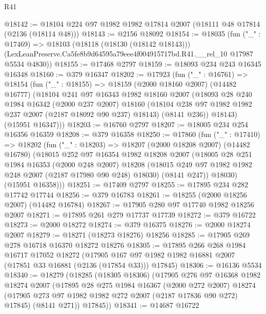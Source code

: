 \begin{lexlean}{R41}
\begin{coremodule}
@18142 := @18104 @224 @97 @1982 @1982 @17814 @2007 (@18111 @48 @17814 (@2136 (@18114 @48)))
@18143 := @2156 @18092
@18154 := @18035
    (fun ("_" : @17469) =>
    @18103
      (@18118 (@18130 (@18142 @18143)))
      (LexLeanPreserve.Ca5fe8b9d64595a79eee4f004915717bd.R41.__rel_10 @17987 @5534 @4830))
@18155 := @17468 @2797
@18159 := @18093 @234 @243 @16345 @16348
@18160 := @379 @16347
@18202 := @17923
    (fun ("_" : @16761) =>
    @18154
      (fun ("_" : @18155) =>
      @18159
        (@2000 @18160 @2007)
        (@14482 @16777)
        (@18104
          @241
          @97
          @16343
          @1982
          @18160
          @2007
          (@18093
            @28
            @240
            @1984
            @16342
            (@2000 @237 @2007)
            @18160
            (@18104 @238 @97 @1982 @1982 @237 @2007 (@2187 @18092 @90 @237) @18143)
            (@8141 @236))
          @18143)
        (@15951 @16347)))
@18203 := @16760 @2797
@18207 := @18005 @234 @254 @16356 @16359
@18208 := @379 @16358
@18250 := @17860
    (fun ("_" : @17410) =>
    @18202
      (fun ("_" : @18203) =>
      @18207
        (@2000 @18208 @2007)
        (@14482 @16780)
        (@18015
          @252
          @97
          @16354
          @1982
          @18208
          @2007
          (@18005
            @28
            @251
            @1984
            @16353
            (@2000 @248 @2007)
            @18208
            (@18015 @249 @97 @1982 @1982 @248 @2007 (@2187 @17980 @90 @248) @18030)
            (@8141 @247))
          @18030)
        (@15951 @16358)))
@18251 := @17409 @2797
@18255 := @17895 @234 @282 @17742 @17744
@18256 := @379 @16783
@18261 := @18255 (@2000 @18256 @2007) (@14482 @16784)
@18267 := @17905 @280 @97 @17740 @1982 @18256 @2007
@18271 := @17895 @261 @279 @17737 @17739
@18272 := @379 @16722
@18273 := @2000 @18272
@18274 := @379 @16375
@18276 := @2000 @18274 @2007
@18279 := @18271 (@18273 @18276) @18256
@18285 := @17905 @269 @278 @16718 @16370 @18272 @18276
@18305 := @17895
    @266
    @268
    @1984
    @16717
    @17052
    @18272
    (@17905 @167 @97 @1982 @1982 @16881 @2007 (@17851 @33 @16881 (@2136 (@17854 @33))) @17845)
@18306 := @16136 @5534
@18340 := @18279
    (@18285
      (@18305 @18306)
      (@17905
        @276
        @97
        @16368
        @1982
        @18274
        @2007
        (@17895
          @28
          @275
          @1984
          @16367
          (@2000 @272 @2007)
          @18274
          (@17905 @273 @97 @1982 @1982 @272 @2007 (@2187 @17836 @90 @272) @17845)
          (@8141 @271))
        @17845))
@18341 := @14687 @16722

\end{coremodule}
\end{lexlean}
